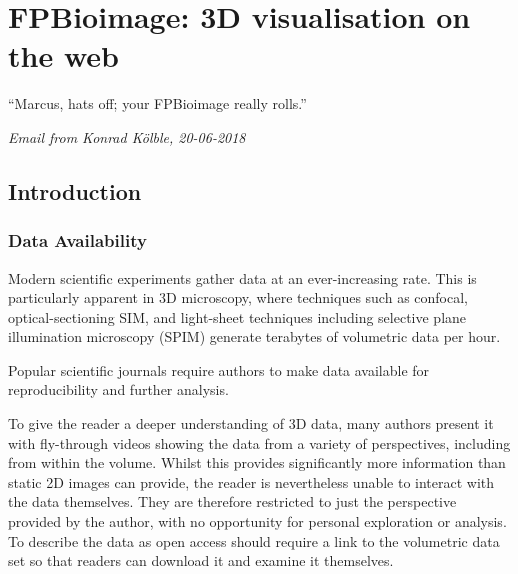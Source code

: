 \chapter{FPBioimage: 3D visualisation on the web} \label{chap:FPB}



\ifpdf
    \graphicspath{{Chapter3/Figs/Raster/}{Chapter3/Figs/PDF/}{Chapter3/Figs/}}
\else
    \graphicspath{{Chapter3/Figs/Vector/}{Chapter3/Figs/}}
\fi

``Marcus, hats off; your FPBioimage really rolls.''

\textit{Email from Konrad K\"olble, 20-06-2018}

\section{Introduction}
\subsection{Data Availability} \label{sec:introvisual}
Modern scientific experiments gather data at an ever-increasing rate. 
This is particularly apparent in 3D microscopy, where techniques such as confocal, optical-sectioning SIM, and light-sheet techniques including selective plane illumination microscopy (SPIM) generate terabytes of volumetric data per hour. 

Popular scientific journals require authors to make data available for reproducibility and further analysis. %

To give the reader a deeper understanding of 3D data, many authors present it with fly-through videos showing the data from a variety of perspectives, including from within the volume. 
Whilst this provides significantly more information than static 2D images can provide, the reader is nevertheless unable to interact with the data themselves. 
They are therefore restricted to just the perspective provided by the author, with no opportunity for personal exploration or analysis.
To describe the data as open access should require a link to the volumetric data set so that readers can download it and examine it themselves. 

